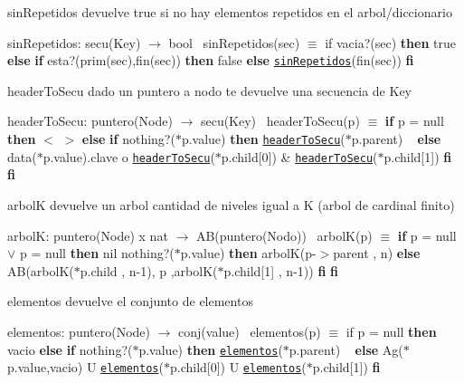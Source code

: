 \begin{DoxyParagraph}{sin\+Repetidos}
devuelve true si no hay elementos repetidos en el arbol/diccionario

sin\+Repetidos\+: secu(\+Key) $\to$ bool~\newline
 sin\+Repetidos(sec) $\equiv$ if vacia?(sec) {\bfseries then} true {\bfseries else} {\bfseries if} esta?(prim(sec),fin(sec)) {\bfseries then} false {\bfseries else} \href{axiomas.html#sinRepetidos}{\tt sin\+Repetidos}(fin(sec)) {\bfseries fi} 
\end{DoxyParagraph}


\begin{DoxyParagraph}{header\+To\+Secu}
dado un puntero a nodo te devuelve una secuencia de Key

header\+To\+Secu\+: puntero(\+Node) $\to$ secu(\+Key)~\newline
 header\+To\+Secu(p) $\equiv$ {\bfseries if} p = null {\bfseries then} $<$ $>$ {\bfseries else} {\bfseries if} nothing?($\ast$p.value) {\bfseries then} \href{axiomas.html#headerToSecu}{\tt header\+To\+Secu}($\ast$p.parent) ~\newline
 {\bfseries else} data($\ast$p.value).clave o \href{axiomas.html#headerToSecu}{\tt header\+To\+Secu}($\ast$p.child\mbox{[}0\mbox{]}) \& \href{axiomas.html#headerToSecu}{\tt header\+To\+Secu}($\ast$p.child\mbox{[}1\mbox{]}) {\bfseries fi} {\bfseries fi} 
\end{DoxyParagraph}


\begin{DoxyParagraph}{arbolK}
devuelve un arbol cantidad de niveles igual a K (arbol de cardinal finito)

arbolK\+: puntero(\+Node) x nat $\to$ A\+B(puntero(\+Nodo))~\newline
 arbol\+K(p) $\equiv$ {\bfseries if} p = null $\lor$ p = null {\bfseries then} nil  nothing?($\ast$p.value) {\bfseries then} arbolK(p-\/$>$parent , n) {\bfseries else} ~\newline
 AB(arbolK($\ast$p.child , n-\/1), p ,arbolK($\ast$p.child\mbox{[}1\mbox{]} , n-\/1)) {\bfseries fi} {\bfseries fi} 
\end{DoxyParagraph}


\begin{DoxyParagraph}{elementos}
devuelve el conjunto de elementos

elementos\+: puntero(\+Node) $\to$ conj(value)~\newline
 elementos(p) $\equiv$ if p = null {\bfseries then} vacio {\bfseries else} {\bfseries if} nothing?($\ast$p.value) {\bfseries then} \href{axiomas.html#elementos}{\tt elementos}($\ast$p.parent) ~\newline
 {\bfseries else} Ag($\ast$p.value,vacio) U \href{axiomas.html#elementos}{\tt elementos}($\ast$p.child\mbox{[}0\mbox{]}) U \href{axiomas.html#elementos}{\tt elementos}($\ast$p.child\mbox{[}1\mbox{]}) {\bfseries fi} 
\end{DoxyParagraph}


